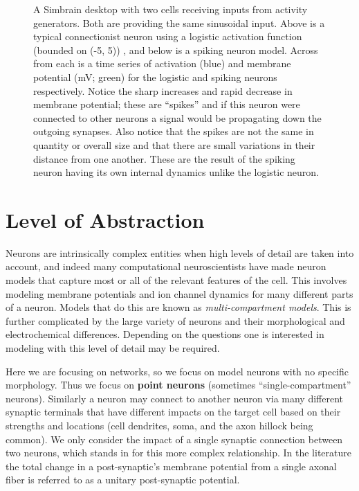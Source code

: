 \begin{figure}[h]
\centering
{}
\caption[Simbrain screenshot by Zo\"e Tosi]{A Simbrain desktop with two cells receiving inputs from activity generators. Both are providing the same sinusoidal input. Above is a typical connectionist neuron using a logistic activation function (bounded on (-5, 5)) , and below is a spiking neuron model. Across from each is a time series of activation (blue)  and membrane potential (mV; green) for the logistic and spiking neurons respectively. Notice the sharp increases and rapid decrease in membrane potential; these are ``spikes'' and if this neuron were connected to other neurons a signal would be propagating down the outgoing synapses. Also notice that the spikes are not the same in quantity or overall size and that there are small variations in their distance from one another. These are the result of the spiking neuron having its own internal dynamics unlike the logistic neuron.}
\label{TSComp}
\end{figure}

\section{Level of Abstraction}

Neurons are intrinsically complex entities when high levels of detail are taken into account, and indeed many computational neuroscientists have made neuron models that capture most or all of the relevant features of the cell. This involves modeling membrane potentials and ion channel dynamics for many different parts of a neuron. Models that do this are known as \emph{multi-compartment models}. This is further complicated by the large variety of neurons and their morphological and electrochemical differences. Depending on the questions one is interested in modeling with this level of detail may be required.

Here we are focusing on networks, so we focus on model neurons with no specific morphology. Thus we focus on \textbf{point neurons} (sometimes ``single-compartment'' neurons). Similarly a neuron may connect to another neuron via many different synaptic terminals that have different impacts on the target cell based on their strengths and locations (cell dendrites, soma, and the axon hillock being common). We only consider the impact of a single synaptic connection between two neurons, which stands in for this more complex relationship. In the literature the total change in a post-synaptic's membrane potential from a single axonal fiber is referred to as a unitary post-synaptic potential.

